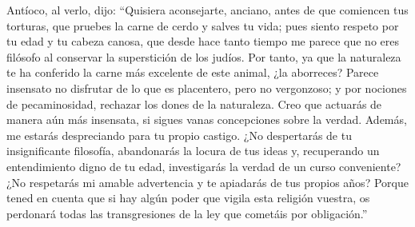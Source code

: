  Antíoco, al verlo, dijo:  ``Quisiera
aconsejarte, anciano, antes de que comiencen tus torturas, que pruebes
la carne de cerdo y salves tu vida; pues siento respeto por tu edad y tu
cabeza canosa, que desde hace tanto tiempo me parece que no eres
filósofo al conservar la superstición de los judíos.  Por
tanto, ya que la naturaleza te ha conferido la carne más excelente de
este animal, ¿la aborreces?  Parece insensato no disfrutar
de lo que es placentero, pero no vergonzoso; y por nociones de
pecaminosidad, rechazar los dones de la naturaleza.  Creo
que actuarás de manera aún más insensata, si sigues vanas concepciones
sobre la verdad.  Además, me estarás despreciando para tu
propio castigo.  ¿No despertarás de tu insignificante
filosofía, abandonarás la locura de tus ideas y, recuperando un
entendimiento digno de tu edad, investigarás la verdad de un curso
conveniente?  ¿No respetarás mi amable advertencia y te
apiadarás de tus propios años?  Porque tened en cuenta
que si hay algún poder que vigila esta religión vuestra, os perdonará
todas las transgresiones de la ley que cometáis por obligación.''

